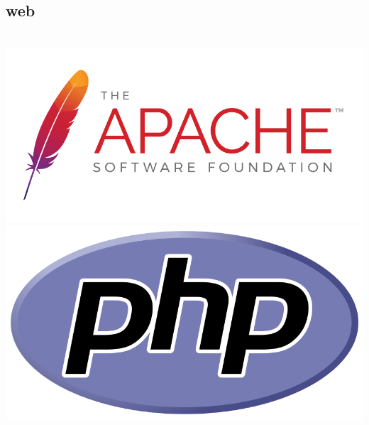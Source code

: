 \subsection{web}
\begin{frame}
    \frametitle{}
    \begin{columns}
            \includegraphics[width=\textwidth]{Apache_Software_Foundation_Logo.png}
            \includegraphics[width=\textwidth]{PHP-logo.png}
    \end{columns}
\end{frame}

